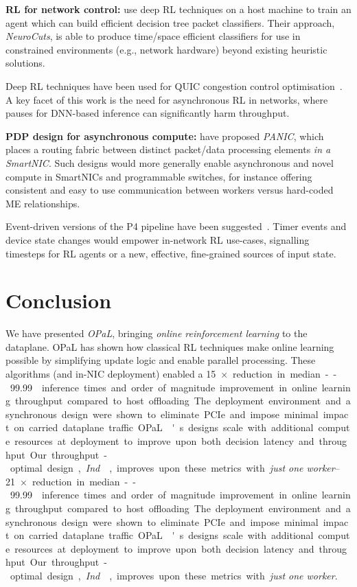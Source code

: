 \documentclass[sigconf,natbib=false]{acmart}
\newcommand{\fakepara}[1]{\noindent\textbf{#1:}}
\newcommand{\approachshort}{OPaL}
\newcommand{\Indfw}{\emph{Ind}}
\begin{document}
\fakepara{RL for network control}
\Textcite{DBLP:conf/sigcomm/LiangZJS19} use deep RL techniques on a host machine to train an agent which can build efficient decision tree packet classifiers.
Their approach, \emph{NeuroCuts}, is able to produce time/space efficient classifiers for use in constrained environments (e.g., network hardware) beyond existing heuristic solutions.

Deep RL techniques have been used for QUIC congestion control optimisation~\parencite{DBLP:journals/corr/abs-1910-04054}.
A key facet of this work is the need for asynchronous RL in networks, where pauses for DNN-based inference can significantly harm throughput.

\fakepara{PDP design for asynchronous compute}
\Textcite{DBLP:conf/hotnets/StephensAS18} have proposed \emph{PANIC}, which places a routing fabric between distinct packet/data processing elements \emph{in a SmartNIC}.
Such designs would more generally enable asynchronous and novel compute in SmartNICs and programmable switches, for instance offering consistent and easy to use communication between workers versus hard-coded ME relationships.

Event-driven versions of the P4 pipeline have been suggested~\parencite{DBLP:conf/hotnets/IbanezABM19}.
Timer events and device state changes would empower in-network RL use-cases, signalling timesteps for RL agents or a new, effective, fine-grained sources of input state.

\section{Conclusion}
We have presented \emph{\approachshort{}}, bringing \emph{online reinforcement learning} to the dataplane.
\approachshort{} has shown how classical RL techniques make online learning possible by simplifying update logic and enable parallel processing.
These algorithms (and in-NIC deployment) enabled a \SIrange{15}{21}{$\times$} reduction in median--\num{99.99} inference times and order of magnitude improvement in online learning throughput compared to host offloading.
The deployment environment and asynchronous design were shown to eliminate PCIe and impose minimal impact on carried dataplane traffic.
\approachshort{}'s designs scale with additional compute resources at deployment to improve upon both decision latency and throughput.
Our throughput-optimal design, \Indfw{}, improves upon these metrics with \emph{just one worker}.
\end{document}
